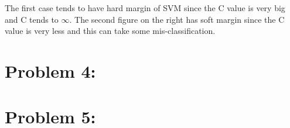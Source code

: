 \documentclass[5pt,a4paper]{article}
\begin{document}
The first case tends to have hard margin of SVM since the C value is very big and C tends to $\infty$. The second figure on the right has soft margin since the C value is very less and this can take some mis-classification.\\ 

	
	
	\section*{Problem 4:}
	
	\section*{Problem 5:}
	
	
\end{document}
